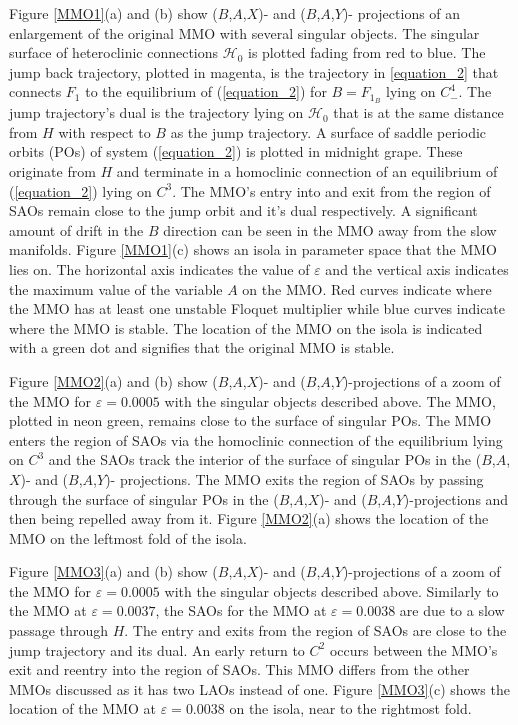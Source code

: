 \documentclass{ws-ijbc}
\begin{document}
Figure \ref{MMO1}(a) and (b) show ($B$,$A$,$X$)- and ($B$,$A$,$Y$)- projections of an enlargement of the original MMO with several singular objects.  The singular surface of heteroclinic connections $\mathscr{H}_0$ is plotted fading from red to blue.  The jump back trajectory, plotted in magenta, is the trajectory in \ref{equation_2} that connects $F_1$ to the equilibrium of (\ref{equation_2}) for $B=F_{1_B}$ lying on $C^4_-$.  The jump trajectory's dual is the trajectory lying on $\mathscr{H}_0$ that is at the same distance from $H$ with respect to $B$ as the jump trajectory.  A surface of saddle periodic orbits (POs) of system (\ref{equation_2}) is plotted in midnight grape.  These originate from $H$ and terminate in a homoclinic connection of an equilibrium of (\ref{equation_2}) lying on $C^3$.  The MMO's entry into and exit from the region of SAOs remain close to the jump orbit and it's dual respectively.  A significant amount of drift in the $B$ direction can be seen in the MMO away from the slow manifolds.  Figure \ref{MMO1}(c) shows an isola in parameter space that the MMO lies on.  The horizontal axis indicates the value of $\varepsilon$ and the vertical axis indicates the maximum value of the variable $A$ on the MMO.  Red curves indicate where the MMO has at least one unstable Floquet multiplier while blue curves indicate where the MMO is stable.  The location of the MMO on the isola is indicated with a green dot and signifies that the original MMO is stable.

Figure \ref{MMO2}(a) and (b) show ($B$,$A$,$X$)- and ($B$,$A$,$Y$)-projections of a zoom of the MMO for $\varepsilon=0.0005$ with the singular objects described above.  The MMO, plotted in neon green, remains close to the surface of singular POs.  The MMO enters the region of SAOs via the homoclinic connection of the equilibrium lying on $C^3$ and the SAOs track the interior of the surface of singular POs in the ($B$,$A$,$X$)- and ($B$,$A$,$Y$)- projections.  The MMO exits the region of SAOs by passing through the surface of singular POs in the ($B$,$A$,$X$)- and ($B$,$A$,$Y$)-projections and then being repelled away from it.  Figure \ref{MMO2}(a) shows the location of the MMO on the leftmost fold of the isola.

Figure \ref{MMO3}(a) and (b) show ($B$,$A$,$X$)- and ($B$,$A$,$Y$)-projections of a zoom of the MMO for $\varepsilon=0.0005$ with the singular objects described above.  Similarly to the MMO at $\varepsilon=0.0037$, the SAOs for the MMO at $\varepsilon = 0.0038$ are due to a slow passage through $H$.  The entry and exits from the region of SAOs are close to the jump trajectory and its dual.  An early return to $C^2$ occurs between the MMO's exit and reentry into the region of SAOs.  This MMO differs from the other MMOs discussed as it has two LAOs instead of one.  Figure \ref{MMO3}(c) shows the location of the MMO at $\varepsilon=0.0038$ on the isola, near to the rightmost fold.
\end{document}
